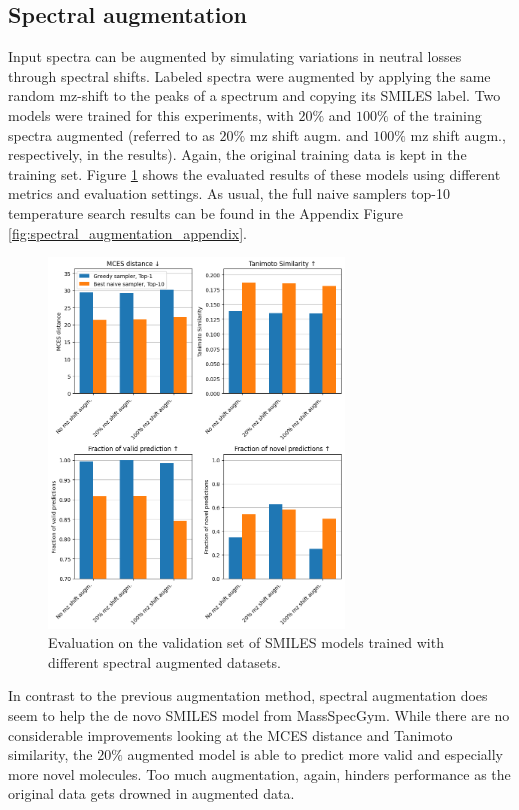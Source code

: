 \subsection{Spectral augmentation}

Input spectra can be augmented by simulating variations in neutral losses through spectral shifts.
Labeled spectra were augmented by applying the same random mz-shift to the peaks of a spectrum and copying its SMILES label.
Two models were trained for this experiments, with $20\%$ and $100\%$ of the training spectra augmented (referred to as $20\%$ mz shift augm. and $100\%$ mz shift augm., respectively, in the results).
Again, the original training data is kept in the training set.
Figure \ref{fig:spectral_augm} shows the evaluated results of these models using different metrics and evaluation settings.
As usual, the full naive samplers top-10 temperature search results can be found in the Appendix Figure \ref{fig:spectral_augmentation_appendix}.

\begin{figure}[h]
    \centering
    \includegraphics[width=0.7\textwidth]{figures/results/spectrum_augmentation_with_tanimoto.png}
    \caption{Evaluation on the validation set of SMILES models trained with different spectral augmented datasets.}
    \label{fig:spectral_augm}
\end{figure}

In contrast to the previous augmentation method, spectral augmentation does seem to help the de novo SMILES model from MassSpecGym.
While there are no considerable improvements looking at the MCES distance and Tanimoto similarity, the $20\%$ augmented model is able to predict more valid and especially more novel molecules.
Too much augmentation, again, hinders performance as the original data gets drowned in augmented data.

